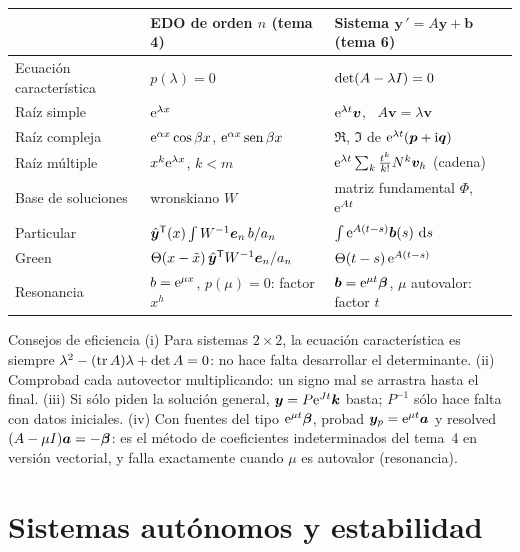 \documentclass[11pt,twoside]{article}
\newcommand\vy{\bm{y}}
\newcommand\vb{\bm{b}}
\newcommand\vv{\bm{v}}
\newcommand\vk{\bm{k}}
\newcommand\vp{\bm{p}}
\newcommand\vq{\bm{q}}
\begin{document}
\begin{center}
\renewcommand\arraystretch{1.3}
\small
\begin{tabular}{@{}l l l@{}}
\toprule
& \textcolor{acc}{EDO de orden $n$ (tema 4)} & \textcolor{acc}{Sistema $\vy\,'=A\vy+\vb$ (tema 6)}\\
\midrule
Ecuación característica & $p(\lambda)=0$ & $\det(A-\lambda I)=0$\\
Raíz simple & $\mathrm{e}^{\lambda x}$ & $\e^{\lambda t}\vv$, \ $A\vv=\lambda\vv$\\
Raíz compleja & $\mathrm{e}^{\alpha x}\cos\beta x$, $\mathrm{e}^{\alpha x}\operatorname{sen}\beta x$ & $\Re$, $\Im$ de $\e^{\lambda t}(\vp+\iu\vq)$\\
Raíz múltiple & $x^k\mathrm{e}^{\lambda x}$, $k<m$ & $\e^{\lambda t}\sum_k\frac{t^k}{k!}N^k\vv_h$ (cadena)\\
Base de soluciones & wronskiano $W$ & matriz fundamental $\Phi$, \ $\mathrm{e}^{At}$\\
Particular & $\hat{\bm y}^{\mathsf T}(x)\int W^{-1}\bm e_n\,b/a_n$ & $\int\e^{A(t-s)}\vb(s)\,\dd s$\\
Green & $\Theta(x-\tilde x)\,\hat{\bm y}^{\mathsf T} W^{-1}\bm e_n/a_n$ & $\Theta(t-s)\,\mathrm{e}^{A(t-s)}$\\
Resonancia & $b=\mathrm{e}^{\mu x}$, $p(\mu)=0$: factor $x^h$ & $\vb=\e^{\mu t}\bm\beta$, $\mu$ autovalor: factor $t$\\
\bottomrule
\end{tabular}
\end{center}

\begin{consejo}{Consejos de eficiencia}
(i) Para sistemas $2\times2$, la ecuación característica es siempre $\lambda^2-(\operatorname{tr} A)\lambda+\det A=0$: no hace falta
desarrollar el determinante. (ii) Comprobad cada autovector multiplicando: un signo mal se arrastra hasta el final.
(iii) Si sólo piden la solución general, $\vy=P\e^{Jt}\vk$ basta; $P^{-1}$ sólo hace falta con datos iniciales.
(iv) Con fuentes del tipo $\mathrm{e}^{\mu t}\bm\beta$, probad $\vy_p=\e^{\mu t}\bm a$ y resolved $(A-\mu I)\bm a=-\bm\beta$:
es el método de coeficientes indeterminados del tema~4 en versión vectorial, y falla exactamente cuando $\mu$ es
autovalor (resonancia).
\end{consejo}

\section{Sistemas autónomos y estabilidad}\label{sec:estabilidad}
\end{document}
